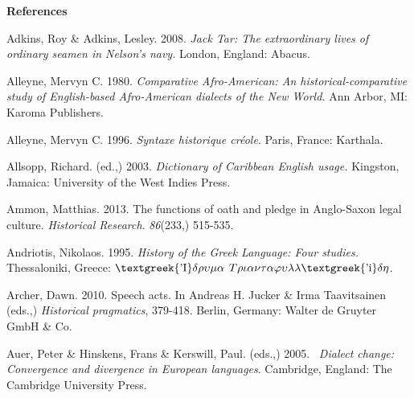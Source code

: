 \clearpage\begin{styleStandard}
\textbf{References}
\end{styleStandard}

\begin{styleStandard}
Adkins, Roy \& Adkins, Lesley. 2008. \textit{Jack Tar: The extraordinary lives of ordinary seamen in Nelson’s navy. }London, England: Abacus.
\end{styleStandard}

\begin{styleStandard}
Alleyne, Mervyn C. 1980. \textit{Comparative Afro-American: An historical-comparative study of English-based Afro-American dialects of the New World. }Ann Arbor, MI: Karoma Publishers.
\end{styleStandard}

\begin{styleStandard}
Alleyne, Mervyn C. 1996. \textit{Syntaxe historique cr\'{e}ole}. Paris, France: Karthala.
\end{styleStandard}

\begin{styleStandard}
Allsopp, Richard. (ed.,) 2003. \textit{Dictionary of Caribbean English usage. }Kingston, Jamaica: University of the West Indies Press.
\end{styleStandard}

\begin{styleStandard}
Ammon, Matthias. 2013. The functions of oath and pledge in Anglo-Saxon legal culture. \textit{Historical Research}. \textit{86}(233,) 515-535.
\end{styleStandard}

\begin{styleStandard}
Andriotis, Nikolaos. 1995. \textit{History of the Greek Language: Four studies.} Thessaloniki, Greece: $\text{\textgreek{'I}}\delta \rho \upsilon \mu \alpha $ $T\rho \iota \alpha \nu \tau \alpha \varphi \upsilon \lambda \lambda \text{\textgreek{'i}}\delta \eta $.
\end{styleStandard}

\begin{styleStandard}
Archer, Dawn. 2010. Speech acts. In Andreas H. Jucker \& Irma Taavitsainen (eds.,) \textit{Historical pragmatics}, 379-418. Berlin, Germany: Walter de Gruyter GmbH \& Co.
\end{styleStandard}

\begin{styleStandard}
Auer, Peter \& Hinskens, Frans \& Kerswill, Paul. (eds.,) 2005. \ \textit{Dialect change: Convergence and divergence in European languages}. Cambridge, England: The Cambridge University Press. 
\end{styleStandard}

